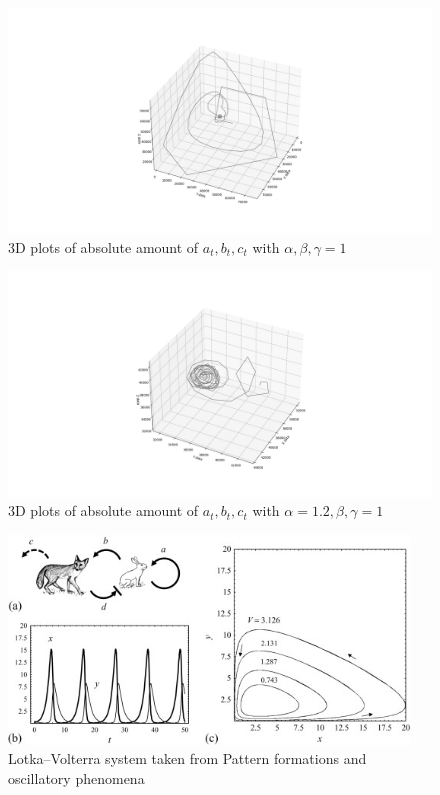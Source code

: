 \documentclass[12pt, A4]{article}
\begin{document}
\begin{figure}[b]
  \begin{center}
    \includegraphics[width=1.2\textwidth]{3d.png}
  \end{center}
  \caption{3D plots of absolute amount of $a_t, b_t, c_t$ with $\alpha,\beta,\gamma =1$}
  \label{fig:3d}
\end{figure}

\begin{figure}[b]
  \begin{center}
    \includegraphics[width=1.2\textwidth]{3d2.png}
  \end{center}
  \caption{3D plots of absolute amount of $a_t, b_t, c_t$ with $\alpha=1.2 ,\beta,\gamma =1$}
  \label{fig:3d2}
\end{figure}

\begin{figure}
  \begin{center}
    \includegraphics[width=0.95\textwidth]{pred_pray.jpg}
  \end{center}
  \caption{Lotka–Volterra system taken from Pattern formations and oscillatory phenomena\cite{kinoshita2013pattern}}
  \label{fig:pred_pray}
\end{figure}
\end{document}
